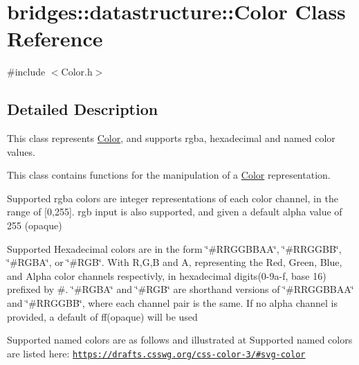 \hypertarget{classbridges_1_1datastructure_1_1_color}{}\section{bridges\+:\+:datastructure\+:\+:Color Class Reference}
\label{classbridges_1_1datastructure_1_1_color}


{\ttfamily \#include $<$Color.\+h$>$}



\subsection{Detailed Description}
This class represents \mbox{\hyperlink{classbridges_1_1datastructure_1_1_color}{Color}}, and supports rgba, hexadecimal and named color values. 

This class contains functions for the manipulation of a \mbox{\hyperlink{classbridges_1_1datastructure_1_1_color}{Color}} representation.

Supported rgba colors are integer representations of each color channel, in the range of \mbox{[}0,255\mbox{]}. rgb input is also supported, and given a default alpha value of 255 (opaque)

Supported Hexadecimal colors are in the form \char`\"{}\#\+R\+R\+G\+G\+B\+B\+A\+A\char`\"{}, \char`\"{}\#\+R\+R\+G\+G\+B\+B\char`\"{}, \char`\"{}\#\+R\+G\+B\+A\char`\"{}, or \char`\"{}\#\+R\+G\+B\char`\"{}. With R,G,B and A, representing the Red, Green, Blue, and Alpha color channels respectivly, in hexadecimal digits(0-\/9a-\/f, base 16) prefixed by \textquotesingle{}\#\textquotesingle{}. \char`\"{}\#\+R\+G\+B\+A\char`\"{} and \char`\"{}\#\+R\+G\+B\char`\"{} are shorthand versions of \char`\"{}\#\+R\+R\+G\+G\+B\+B\+A\+A\char`\"{} and \char`\"{}\#\+R\+R\+G\+G\+B\+B\char`\"{}, where each channel pair is the same. If no alpha channel is provided, a default of \textquotesingle{}ff\textquotesingle{}(opaque) will be used

Supported named colors are as follows and illustrated at Supported named colors are listed here\+: \href{https://drafts.csswg.org/css-color-3/#svg-color}{\tt https\+://drafts.\+csswg.\+org/css-\/color-\/3/\#svg-\/color}


